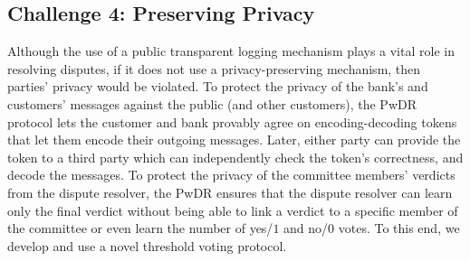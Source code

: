 \vspace{-3mm}
\subsection{Challenge 4: Preserving Privacy}
 Although the use of a public transparent logging mechanism plays a vital role in resolving disputes, if it does not use a  privacy-preserving mechanism, then  parties' privacy would be violated. To protect the  privacy of the bank's and customers' messages against the public (and other customers), the PwDR protocol lets the customer and bank provably agree on encoding-decoding tokens that let them  encode their outgoing messages. Later, either party can provide the token to a third party which can independently check the token's correctness, and decode the messages. To protect the privacy of the committee members' verdicts from the  dispute resolver, the PwDR   ensures that  the dispute resolver can learn only the final verdict without being able to link a verdict to a specific  member of the committee or even learn the number of yes/$1$ and no/$0$ votes. To this end, we develop and use a novel threshold voting protocol. 
 
 
 
 